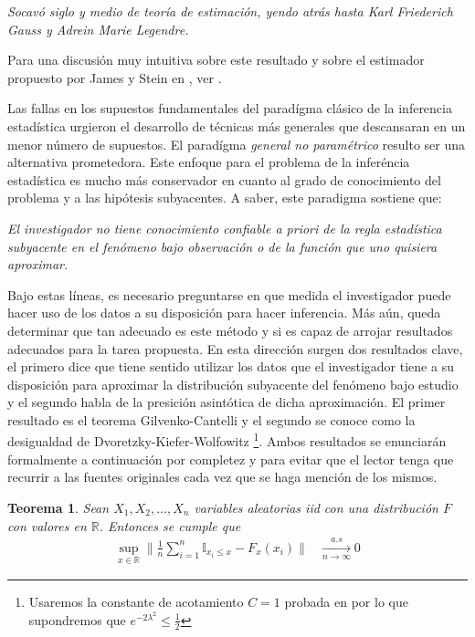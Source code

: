 \documentclass{book}
\theoremstyle{plain}
\newtheorem{thm}{Teorema}[section]
\theoremstyle{definition}
\theoremstyle{remark}
\begin{document}
\begin{changemargin}{1.5cm}{1.5cm}
\emph{Socavó siglo y medio de teoría de estimación, yendo atrás hasta Karl Friederich Gauss y Adrein Marie Legendre.}
\end{changemargin}

Para una discusión muy intuitiva sobre este resultado y sobre el estimador propuesto por James y Stein en \cite{STEIN2}, ver \cite{EFRON}. 

Las fallas en los supuestos fundamentales del paradígma clásico de la inferencia estadística urgieron el desarrollo de técnicas más generales que descansaran en un menor número de supuestos. El paradígma \emph{general no paramétrico} resulto ser una alternativa prometedora. Este enfoque para el problema de la inferéncia estadística  es mucho más conservador en cuanto al grado de conocimiento del problema y a las hipótesis subyacentes. A saber, este paradigma sostiene que:

\begin{changemargin}{1.5cm}{1.5cm}
\emph{El investigador no tiene conocimiento confiable a priori de la regla estadística subyacente en el fenómeno bajo observación o de la función que uno quisiera aproximar.}
\end{changemargin}

Bajo estas líneas, es necesario preguntarse en que medida el investigador puede hacer uso de los datos a su disposición para hacer inferencia. Más aún, queda determinar que tan adecuado es este método y si es capaz de arrojar resultados adecuados para la tarea propuesta. En esta dirección surgen dos resultados clave, el primero dice que tiene sentido utilizar los datos que el investigador tiene a su disposición para aproximar la distribución subyacente del fenómeno bajo estudio y el segundo habla de la presición asintótica de dicha aproximación. El primer resultado es el teorema  Gilvenko-Cantelli y el segundo se conoce como la desigualdad de Dvoretzky-Kiefer-Wolfowitz \footnote{Usaremos la constante de acotamiento $C=1$ probada en \cite{MASSART} por lo que supondremos que $ e^{-2\lambda^2}\leq\frac{1}{2}$}. Ambos resultados se enunciarán formalmente a continuación por completez y para evitar que el lector tenga que recurrir a las fuentes originales cada vez que se haga mención de los mismos.
\bigskip

\begin{thm}
Sean $X_1,X_2,\dots,X_n$ variables aleatorias iid con una distribución $F$ con valores en $\mathbb{R}$. Entonces se cumple que
\begin{equation*}
\begin{split}
\displaystyle\sup_{x\in\mathbb{R}}\bigg\|\frac{1}{n}\displaystyle\sum_{i=1}^n\mathbb{I}_{x_i\leq x}-F_{x}(x_i)\bigg\| &\xrightarrow[n\rightarrow\infty]{a.s} 0
\end{split}
\end{equation*}
\end{thm}
\end{document}
